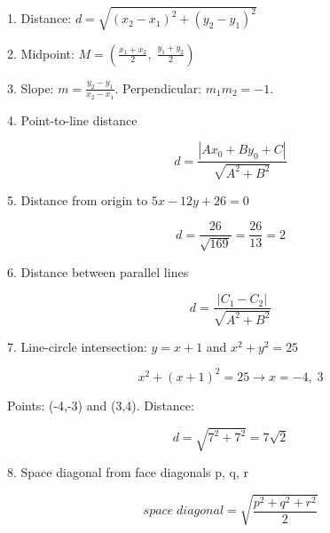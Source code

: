 1. Distance: $d = \sqrt{(x_2-x_1)^2+(y_2-y_1)^2}$

2. Midpoint: $M = \left(\frac{x_1+x_2}{2},\; \frac{y_1+y_2}{2}\right)$

3. Slope: $m = \frac{y_2-y_1}{x_2-x_1}$. Perpendicular: $m_1 m_2 = -1$.

4. Point-to-line distance

$$ d = \frac{|Ax_0+By_0+C|}{\sqrt{A^2+B^2}} $$

5. Distance from origin to $5x - 12y + 26 = 0$

$$ d = \frac{26}{\sqrt{169}} = \frac{26}{13} = 2 $$

6. Distance between parallel lines

$$ d = \frac{|C_1-C_2|}{\sqrt{A^2+B^2}} $$

7. Line-circle intersection: $y=x+1$ and $x^2+y^2=25$

$$ x^2+(x+1)^2=25 \rightarrow x=-4, \; 3 $$

Points: (-4,-3) and (3,4). Distance:

$$ d = \sqrt{7^2+7^2} = 7\sqrt{2} $$

8. Space diagonal from face diagonals p, q, r

$$ space \; diagonal = \sqrt{\frac{p^2+q^2+r^2}{2}} $$
